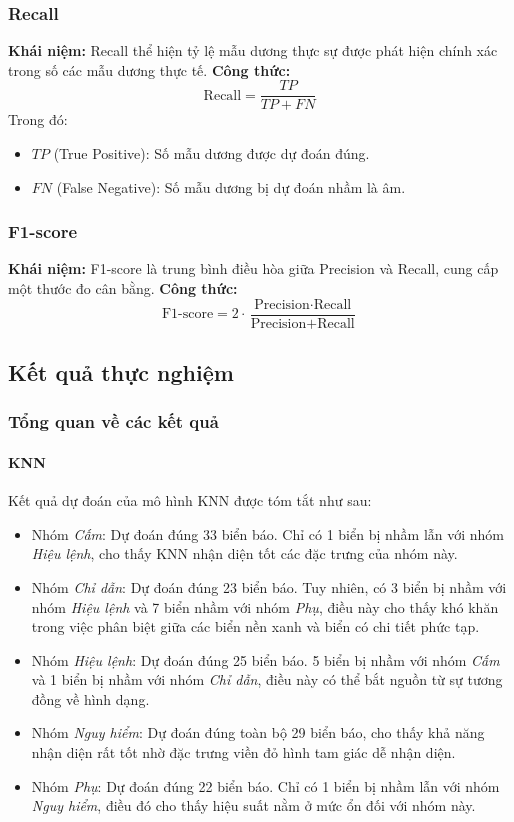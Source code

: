 \documentclass[a4paper,12pt]{article}
\begin{document}
\subsubsection{Recall}
\textbf{Khái niệm:} Recall thể hiện tỷ lệ mẫu dương thực sự được phát hiện chính xác trong số các mẫu dương thực tế.  
\textbf{Công thức:}  
\[
\text{Recall} = \frac{TP}{TP + FN}
\]
Trong đó:
\begin{itemize}
    \item \(TP\) (True Positive): Số mẫu dương được dự đoán đúng.
    \item \(FN\) (False Negative): Số mẫu dương bị dự đoán nhầm là âm.
\end{itemize}

\subsubsection{F1-score}
\textbf{Khái niệm:} F1-score là trung bình điều hòa giữa Precision và Recall, cung cấp một thước đo cân bằng.  
\textbf{Công thức:}  
\[
\text{F1-score} = 2 \cdot \frac{\text{Precision} \cdot \text{Recall}}{\text{Precision} + \text{Recall}}
\]

\newpage
\subsection{Kết quả thực nghiệm}

\subsubsection{Tổng quan về các kết quả}

\paragraph{KNN} 
Kết quả dự đoán của mô hình KNN được tóm tắt như sau:
\begin{itemize}
    \item Nhóm \textit{Cấm}: Dự đoán đúng 33 biển báo. Chỉ có 1 biển bị nhầm lẫn với nhóm \textit{Hiệu lệnh}, cho thấy KNN nhận diện tốt các đặc trưng của nhóm này.
    \item Nhóm \textit{Chỉ dẫn}: Dự đoán đúng 23 biển báo. Tuy nhiên, có 3 biển bị nhầm với nhóm \textit{Hiệu lệnh} và 7 biển nhầm với nhóm \textit{Phụ}, điều này cho thấy khó khăn trong việc phân biệt giữa các biển nền xanh và biển có chi tiết phức tạp.
    \item Nhóm \textit{Hiệu lệnh}: Dự đoán đúng 25 biển báo. 5 biển bị nhầm với nhóm \textit{Cấm} và 1 biển bị nhầm với nhóm \textit{Chỉ dẫn}, điều này có thể bắt nguồn từ sự tương đồng về hình dạng.
    \item Nhóm \textit{Nguy hiểm}: Dự đoán đúng toàn bộ 29 biển báo, cho thấy khả năng nhận diện rất tốt nhờ đặc trưng viền đỏ hình tam giác dễ nhận diện.
    \item Nhóm \textit{Phụ}: Dự đoán đúng 22 biển báo. Chỉ có 1 biển bị nhầm lẫn với nhóm \textit{Nguy hiểm}, điều đó cho thấy hiệu suất nằm ở mức ổn đối với nhóm này.
\end{itemize}
\end{document}
